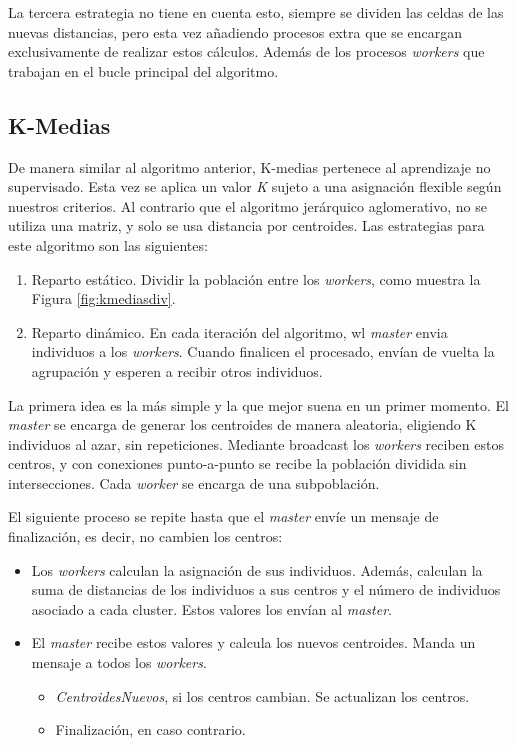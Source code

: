 		La tercera estrategia no tiene en cuenta esto, siempre se dividen las celdas de las nuevas distancias, pero esta vez añadiendo procesos extra que se encargan exclusivamente de realizar estos cálculos. Además de los procesos \textit{workers} que trabajan en el bucle principal del algoritmo.
		
		
	\subsection{K-Medias}
	\label{cap:3_2_2}
		De manera similar al algoritmo anterior, K-medias pertenece al aprendizaje no supervisado. Esta vez se aplica un valor \textit{K} sujeto a una asignación flexible según nuestros criterios. Al contrario que el algoritmo jerárquico aglomerativo, no se utiliza una matriz, y solo se usa distancia por centroides. Las estrategias para este algoritmo son las siguientes:		
		
		
		\begin{enumerate}
			\item Reparto estático. Dividir la población entre los \textit{workers}, como muestra la Figura \ref{fig:kmediasdiv}. 
			\item Reparto dinámico. En cada iteración del algoritmo, wl \textit{master} envia individuos a los \textit{workers}. Cuando finalicen el procesado, envían de vuelta la agrupación y esperen a recibir otros individuos. 
		\end{enumerate}
		
		La primera idea es la más simple y la que mejor suena en un primer momento. El \textit{master} se encarga de generar los centroides de manera aleatoria, eligiendo K individuos al azar, sin repeticiones. Mediante broadcast los \textit{workers} reciben estos centros, y con conexiones punto-a-punto se recibe la población dividida sin intersecciones. Cada \textit{worker} se encarga de una subpoblación. 
		
				
		\begin{mdframed}[roundcorner=5pt]
			El siguiente proceso se repite hasta que el \textit{master} envíe un mensaje de finalización, es decir, no cambien los centros:	
			\begin{itemize}
				\setlength\itemsep{0em} 
				\item Los \textit{workers} calculan la asignación de sus individuos. Además, calculan la suma de distancias de los individuos a sus centros y el número de individuos asociado a cada cluster. Estos valores los envían al \textit{master}.
				\item El \textit{master} recibe estos valores y calcula los nuevos centroides. Manda un mensaje a todos los \textit{workers}. 
				\begin{itemize}
					\setlength\itemsep{0em} 
					\item \textit{CentroidesNuevos}, si los centros cambian. Se actualizan los centros.
					\item Finalización, en caso contrario.
				\end{itemize}
			\end{itemize}
		\end{mdframed}
		
